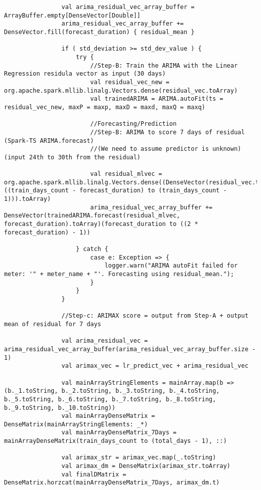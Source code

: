 \documentclass[12pt]{article}
\begin{document}
\begin{lstlisting}
       			val arima_residual_vec_array_buffer = ArrayBuffer.empty[DenseVector[Double]]
       			arima_residual_vec_array_buffer += DenseVector.fill(forecast_duration) { residual_mean }
       			
       			if ( std_deviation >= std_dev_value ) {
       				try {
       					//Step-B: Train the ARIMA with the Linear Regression residula vector as input (30 days)
       					val residual_vec_new = org.apache.spark.mllib.linalg.Vectors.dense(residual_vec.toArray)
       					val trainedARIMA = ARIMA.autoFit(ts = residual_vec_new, maxP = maxp, maxD = maxd, maxQ = maxq)
    
       					//Forecasting/Prediction
       					//Step-B: ARIMA to score 7 days of residual (Spark-TS ARIMA.forecast)
       					//(We need to assume predictor is unknown) (input 24th to 30th from the residual)
    
       					val residual_mlvec = org.apache.spark.mllib.linalg.Vectors.dense((DenseVector(residual_vec.toArray)((train_days_count - forecast_duration) to (train_days_count - 1))).toArray)
       					arima_residual_vec_array_buffer += DenseVector(trainedARIMA.forecast(residual_mlvec, forecast_duration).toArray)(forecast_duration to ((2 * forecast_duration) - 1))
    
       				} catch {
       					case e: Exception => {       	
       						logger.warn("ARIMA autoFit failed for meter: '" + meter_name + "'. Forecasting using residual_mean.");
       					}
       				}
       			}
    
       			//Step-c: ARIMAX score = output from Step-A + output mean of residual for 7 days
    
       			val arima_residual_vec = arima_residual_vec_array_buffer(arima_residual_vec_array_buffer.size - 1)
       			val arimax_vec = lr_predict_vec + arima_residual_vec
    
       			val mainArrayStringElements = mainArray.map(b => (b._1.toString, b._2.toString, b._3.toString, b._4.toString, b._5.toString, b._6.toString, b._7.toString, b._8.toString, b._9.toString, b._10.toString))
       			val mainArrayDenseMatrix = DenseMatrix(mainArrayStringElements: _*)
       			val mainArrayDenseMatrix_7Days = mainArrayDenseMatrix(train_days_count to (total_days - 1), ::)
    
       			val arimax_str = arimax_vec.map(_.toString)
       			val arimax_dm = DenseMatrix(arimax_str.toArray)
       			val finalDMatrix = DenseMatrix.horzcat(mainArrayDenseMatrix_7Days, arimax_dm.t)
    

\end{lstlisting}
\end{document}
